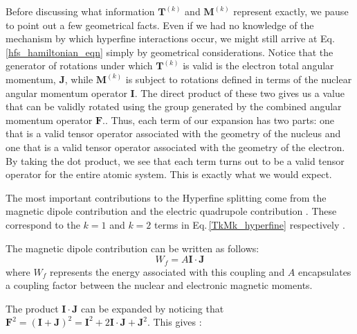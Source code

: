 Before discussing what information $\mathbf{T}^{(k)}$ and $\mathbf{M}^{(k)}$ represent exactly,
we pause to point out a few geometrical facts. Even if we had no knowledge of the mechanism by which hyperfine interactions occur, we might still arrive at Eq.\,\ref{hfs_hamiltonian_eqn} simply by geometrical considerations.
Notice that the generator of rotations under which $\mathbf{T}^{(k)}$ is valid is the electron total angular momentum, $\mathbf{J}$, while $\mathbf{M}^{(k)}$ is subject to rotations defined in terms of the nuclear angular momentum operator $\mathbf{I}$. 
The direct product of these two gives us a value that can be validly rotated using the group generated by the combined angular momentum operator $\mathbf{F}$.\cite{Racah2}\cite{sobelman_spectra}. Thus, each term of our expansion has two parts: one that is a valid tensor operator associated with the geometry of the nucleus and one that is a valid tensor operator associated with the geometry of the electron. By taking the dot product, we see that each term turns out to be a valid tensor operator for the entire atomic system. This is exactly what we would expect.

The most important contributions to the Hyperfine splitting come from the magnetic dipole contribution and the electric quadrupole contribution \cite{sobelman_spectra}\cite{schwartz_hyperfine_expansion}\cite{cuaMITnotes}. These correspond to the $k=1$ and $k=2$ terms in Eq.\,\ref{TkMk_hyperfine} respectively\cite{experimental_hyperfine_alkali_arimondo}
.%

The magnetic dipole contribution can be written as follows: 
\begin{equation}
W_f=A\mathbf{I}\cdot\mathbf{J}
\end{equation}
\cite{sobelman_spectra}
where $W_f$ represents the energy associated with this coupling and $A$ encapsulates a coupling factor between the nuclear and electronic magnetic moments. 

The product $\mathbf{I}\cdot\mathbf{J}$ can be expanded by noticing that $\mathbf{F}^2=(\mathbf{I}+\mathbf{J})^2=\mathbf{I}^2+2 \mathbf{I}\cdot\mathbf{J}+\mathbf{J}^2$. This gives \cite{cuaMITnotes}\cite{sobelman_spectra}: 

